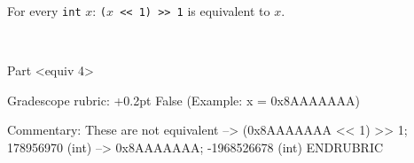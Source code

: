 \subpart
For every \lstinline'int' $x$:
    \lstinline'('$x$\lstinline' << 1) >> 1' is equivalent to $x$.
\begin{framed}
\else~\vspace{0.9in}\fi
\end{framed}

\RUBRIC
Part <equiv 4>

Gradescope rubric:
+0.2pt  False (Example: x = 0x8AAAAAAA)

Commentary:
  These are not equivalent
  --> (0x8AAAAAAA <<  1) >> 1;
  178956970 (int)
  --> 0x8AAAAAAA;
  -1968526678 (int)
ENDRUBRIC

\smallskip
